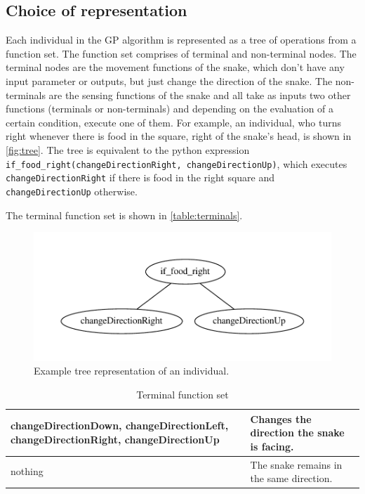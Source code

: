 \documentclass[12pt,a4paper]{article}
\begin{document}
		
	\subsection{Choice of representation}
	Each individual in the GP algorithm is represented as a tree of operations from a function set. The function set comprises of terminal and non-terminal nodes. The terminal nodes are the movement functions of the snake, which don't have any input parameter or outputs, but just change the direction of the snake. The non-terminals are the sensing functions of the snake and all take as inputs two other functions (terminals or non-terminals) and depending on the evaluation of a certain condition, execute one of them. For example, an individual, who turns right whenever there is food in the square, right of the snake's head, is shown in \autoref{fig:tree}. The tree is equivalent to the python expression \lstinline|if_food_right(changeDirectionRight, changeDirectionUp)|, which executes \lstinline|changeDirectionRight| if there is food in the right square and \lstinline|changeDirectionUp| otherwise. 
	
	The terminal function set is shown in \autoref{table:terminals}. 
	
	\begin{figure}[h!]
		\centering
		\includegraphics[width=0.7\linewidth]{figures/tree}
		\caption{Example tree representation of an individual.}
		\label{fig:tree}
	\end{figure}
	
	\begin{table}[]
		\centering
		\begin{tabu} to \textwidth {|X[l]|X[l]|}
			\hline
			changeDirectionDown, changeDirectionLeft, changeDirectionRight, changeDirectionUp & Changes the direction the snake is facing. \\  
			\hline
			nothing & The snake remains in the same direction.  \\  
			\hline
		\end{tabu}
		
		\caption{Terminal function set}
		\label{table:terminals}
	\end{table}
	
\end{document}
